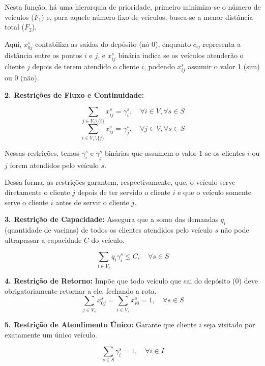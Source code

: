 Nesta função, há uma hierarquia de prioridade, primeiro minimiza-se o número de veículos ($F_1$) e, para aquele número fixo de veículos, busca-se a menor distância total ($F_2$).

Aqui, $x_{0j}^s$ contabiliza as saídas do depósito (nó 0), enquanto $c_{ij}$ representa a distância entre os pontos $i$ e $j$, e $x_{ij}^s$ binária indica se os veículos atenderão o cliente $j$ depois de terem atendido o cliente $i$, podendo $x_{ij}^s$ assumir o valor 1 (sim) ou 0 (não).

\textbf{2. Restrições de Fluxo e Continuidade:}

\begin{equation}
\sum_{j \in V_s \setminus \{i\}} x_{ij}^s = \gamma_i^s, \quad \forall i \in V, \forall s \in S
\end{equation}
\begin{equation}
\sum_{i \in V_s \setminus \{j\}} x_{ij}^s = \gamma_j^s, \quad \forall j \in V, \forall s \in S
\end{equation}

Nessas restrições, temos $\gamma_i^s$ e $\gamma_j^s$ binárias que assumem o valor $1$ se os clientes $i$ ou $j$ forem atendidos pelo veículo $s$.

Dessa forma, as restrições garantem, respectivamente, que, o veículo serve diretamente o cliente $j$ depois de ter servido o cliente $i$ e que o veículo somente serve o cliente $i$ antes de servir o cliente $j$.

\textbf{3. Restrição de Capacidade:}
Assegura que a soma das demandas $q_i$ (quantidade de vacinas) de todos os clientes atendidos pelo veículo $s$ não pode ultrapassar a capacidade $C$ do veículo. 

\begin{equation}
\sum_{i \in V_s} q_i \gamma_i^s \leq C, \quad \forall s \in S
\end{equation}

\textbf{4. Restrição de Retorno:}
Impõe que todo veículo que sai do depósito ($0$) deve obrigatoriamente retornar a ele, fechando a rota. 
\begin{equation}
\sum_{j \in V_s} x_{0j}^s = \sum_{i \in V_s} x_{i0}^s = 1, \quad \forall s \in S
\end{equation}


\textbf{5. Restrição de Atendimento Único:}
Garante que cliente $i$ seja visitado por exatamente um único veículo.

\begin{equation}
\sum_{s \in S} \gamma_i^s = 1, \quad \forall i \in I
\end{equation}


